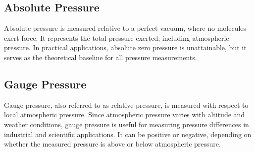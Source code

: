 \documentclass{article}
\begin{document}
\begin{center}
\begin{minipage}{0.46\textwidth}
		\vspace{-1em}
		\label{fig:pressure}
\end{minipage}\end{center}
\begin{center}
\begin{minipage}{0.49\textwidth}
	\subsection{Absolute Pressure}
	Absolute pressure is measured relative to a perfect vacuum, where no molecules exert force. It represents the total pressure exerted, including atmospheric pressure. In practical applications, absolute zero pressure is unattainable, but it serves as the theoretical baseline for all pressure measurements.
\end{minipage}\hfill
\begin{minipage}{0.49\textwidth}
	\subsection{Gauge Pressure}
	Gauge pressure, also referred to as relative pressure, is measured with respect to local atmospheric pressure. Since atmospheric pressure varies with altitude and weather conditions, gauge pressure is useful for measuring pressure differences in industrial and scientific applications. It can be positive or negative, depending on whether the measured pressure is above or below atmospheric pressure.
\end{minipage}
\end{center}
\vspace{-2em}
\end{document}
